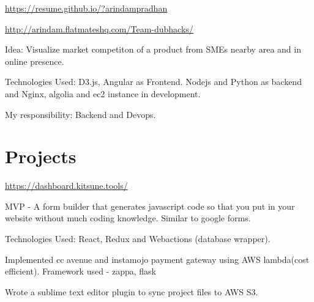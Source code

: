\documentclass[]{deedy-resume-openfont}
\begin{document}
\begin{minipage}[t]{0.66\textwidth}
{ \url{https://resume.github.io/?arindampradhan } }\\
\sectionsep

{ \url{http://arindam.flatmateshq.com/Team-dubhacks/} }\\
\begin{tightemize}
\item Idea: Visualize market competiton of a product from SMEs nearby area and in online presence.
\item Technologies Used: D3.js, Angular as Frontend. Nodejs and Python as backend and Nginx, algolia and ec2 instance in development.
\item My responsibility: Backend and Devops.
\vspace{\topsep} %
\end{tightemize}

\section{Projects}

{ \url{https://dashboard.kitsune.tools/} }\\
\begin{tightemize}
\item MVP - A form builder that generates javascript code so that you put in your website without much coding knowledge. Similar to google forms.
\item Technologies Used: React, Redux and Webactions (database wrapper).
\vspace{\topsep} %
\end{tightemize}

\begin{tightemize}
\item Implemented cc avenue and instamojo payment gateway using AWS lambda(cost efficient). Framework used - zappa, flask
\item Wrote a sublime text editor plugin to sync project files to AWS S3.
\vspace{\topsep} %
\end{tightemize}


\end{minipage}
\end{document}
